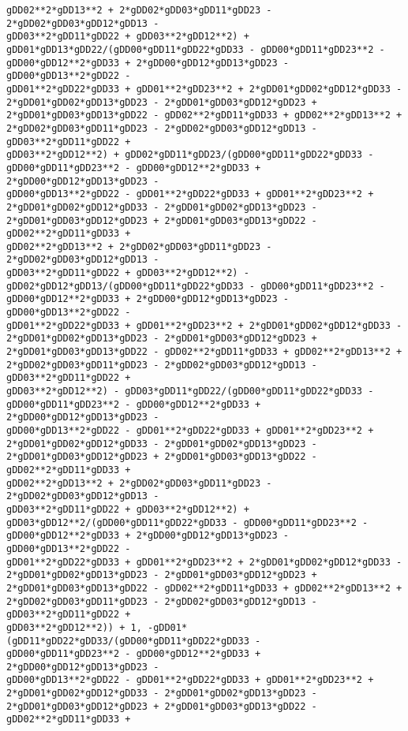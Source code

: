 \documentclass[landscape,letterpaper,10pt,english]{article}
\begin{document}
\begin{Verbatim}[commandchars=\\\{\}]
gDD02**2*gDD13**2 + 2*gDD02*gDD03*gDD11*gDD23 - 2*gDD02*gDD03*gDD12*gDD13 -
gDD03**2*gDD11*gDD22 + gDD03**2*gDD12**2) +
gDD01*gDD13*gDD22/(gDD00*gDD11*gDD22*gDD33 - gDD00*gDD11*gDD23**2 -
gDD00*gDD12**2*gDD33 + 2*gDD00*gDD12*gDD13*gDD23 - gDD00*gDD13**2*gDD22 -
gDD01**2*gDD22*gDD33 + gDD01**2*gDD23**2 + 2*gDD01*gDD02*gDD12*gDD33 -
2*gDD01*gDD02*gDD13*gDD23 - 2*gDD01*gDD03*gDD12*gDD23 +
2*gDD01*gDD03*gDD13*gDD22 - gDD02**2*gDD11*gDD33 + gDD02**2*gDD13**2 +
2*gDD02*gDD03*gDD11*gDD23 - 2*gDD02*gDD03*gDD12*gDD13 - gDD03**2*gDD11*gDD22 +
gDD03**2*gDD12**2) + gDD02*gDD11*gDD23/(gDD00*gDD11*gDD22*gDD33 -
gDD00*gDD11*gDD23**2 - gDD00*gDD12**2*gDD33 + 2*gDD00*gDD12*gDD13*gDD23 -
gDD00*gDD13**2*gDD22 - gDD01**2*gDD22*gDD33 + gDD01**2*gDD23**2 +
2*gDD01*gDD02*gDD12*gDD33 - 2*gDD01*gDD02*gDD13*gDD23 -
2*gDD01*gDD03*gDD12*gDD23 + 2*gDD01*gDD03*gDD13*gDD22 - gDD02**2*gDD11*gDD33 +
gDD02**2*gDD13**2 + 2*gDD02*gDD03*gDD11*gDD23 - 2*gDD02*gDD03*gDD12*gDD13 -
gDD03**2*gDD11*gDD22 + gDD03**2*gDD12**2) -
gDD02*gDD12*gDD13/(gDD00*gDD11*gDD22*gDD33 - gDD00*gDD11*gDD23**2 -
gDD00*gDD12**2*gDD33 + 2*gDD00*gDD12*gDD13*gDD23 - gDD00*gDD13**2*gDD22 -
gDD01**2*gDD22*gDD33 + gDD01**2*gDD23**2 + 2*gDD01*gDD02*gDD12*gDD33 -
2*gDD01*gDD02*gDD13*gDD23 - 2*gDD01*gDD03*gDD12*gDD23 +
2*gDD01*gDD03*gDD13*gDD22 - gDD02**2*gDD11*gDD33 + gDD02**2*gDD13**2 +
2*gDD02*gDD03*gDD11*gDD23 - 2*gDD02*gDD03*gDD12*gDD13 - gDD03**2*gDD11*gDD22 +
gDD03**2*gDD12**2) - gDD03*gDD11*gDD22/(gDD00*gDD11*gDD22*gDD33 -
gDD00*gDD11*gDD23**2 - gDD00*gDD12**2*gDD33 + 2*gDD00*gDD12*gDD13*gDD23 -
gDD00*gDD13**2*gDD22 - gDD01**2*gDD22*gDD33 + gDD01**2*gDD23**2 +
2*gDD01*gDD02*gDD12*gDD33 - 2*gDD01*gDD02*gDD13*gDD23 -
2*gDD01*gDD03*gDD12*gDD23 + 2*gDD01*gDD03*gDD13*gDD22 - gDD02**2*gDD11*gDD33 +
gDD02**2*gDD13**2 + 2*gDD02*gDD03*gDD11*gDD23 - 2*gDD02*gDD03*gDD12*gDD13 -
gDD03**2*gDD11*gDD22 + gDD03**2*gDD12**2) +
gDD03*gDD12**2/(gDD00*gDD11*gDD22*gDD33 - gDD00*gDD11*gDD23**2 -
gDD00*gDD12**2*gDD33 + 2*gDD00*gDD12*gDD13*gDD23 - gDD00*gDD13**2*gDD22 -
gDD01**2*gDD22*gDD33 + gDD01**2*gDD23**2 + 2*gDD01*gDD02*gDD12*gDD33 -
2*gDD01*gDD02*gDD13*gDD23 - 2*gDD01*gDD03*gDD12*gDD23 +
2*gDD01*gDD03*gDD13*gDD22 - gDD02**2*gDD11*gDD33 + gDD02**2*gDD13**2 +
2*gDD02*gDD03*gDD11*gDD23 - 2*gDD02*gDD03*gDD12*gDD13 - gDD03**2*gDD11*gDD22 +
gDD03**2*gDD12**2)) + 1, -gDD01*(gDD11*gDD22*gDD33/(gDD00*gDD11*gDD22*gDD33 -
gDD00*gDD11*gDD23**2 - gDD00*gDD12**2*gDD33 + 2*gDD00*gDD12*gDD13*gDD23 -
gDD00*gDD13**2*gDD22 - gDD01**2*gDD22*gDD33 + gDD01**2*gDD23**2 +
2*gDD01*gDD02*gDD12*gDD33 - 2*gDD01*gDD02*gDD13*gDD23 -
2*gDD01*gDD03*gDD12*gDD23 + 2*gDD01*gDD03*gDD13*gDD22 - gDD02**2*gDD11*gDD33 +

\end{Verbatim}
\end{document}
